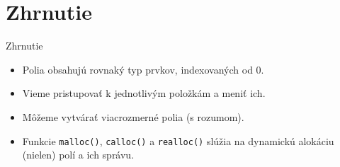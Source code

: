 \documentclass[xcolor=dvipsnames]{beamer}
\begin{document}
\section{Zhrnutie}
\begin{frame}{Zhrnutie}
    \begin{itemize}
        \item Polia obsahujú rovnaký typ prvkov, indexovaných od 0.
        \item Vieme pristupovať k jednotlivým položkám a meniť ich.
        \item Môžeme vytvárať viacrozmerné polia (s rozumom).
        \item Funkcie \texttt{malloc()}, \texttt{calloc()} a \texttt{realloc()} slúžia na dynamickú alokáciu (nielen) polí a ich správu.
    \end{itemize}
\end{frame}
\end{document}
